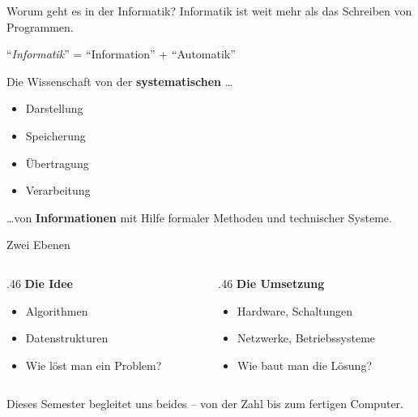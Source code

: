 \renewcommand{\thelektion}{L01 \textperiodcentered{} Was ist Informatik?}

\begin{frame}\end{frame}

\begin{frame}{Worum geht es in der Informatik?}
Informatik ist weit mehr als das Schreiben von Programmen.
\vspace{3mm}
\begin{center}
\enquote{\textit{Informatik}} = \enquote{Information} + \enquote{Automatik}
\end{center}
\vspace{3mm}\pause
Die Wissenschaft von der \textbf{systematischen} \ldots
\begin{itemize}[<+->]\setlength\itemsep{4pt}
  \item Darstellung
  \item Speicherung
  \item Übertragung
  \item Verarbeitung
\end{itemize}
\ldots von \textbf{Informationen} mit Hilfe formaler Methoden und technischer Systeme.
\end{frame}

\begin{frame}{Zwei Ebenen}
\begin{columns}[T,onlytextwidth]
\begin{column}{.46\textwidth}
  \large\bfseries\color{FDUteal}Die Idee
  \vspace{2mm}
  \normalsize\begin{itemize}[<+->]\setlength\itemsep{6pt}
    \item Algorithmen
    \item Datenstrukturen
    \item Wie löst man ein Problem?
  \end{itemize}
\end{column}\pause
\begin{column}{.46\textwidth}
  \large\bfseries\color{FDUblue}Die Umsetzung
  \vspace{2mm}
  \normalsize\begin{itemize}[<+->]\setlength\itemsep{6pt}
    \item Hardware, Schaltungen
    \item Netzwerke, Betriebssysteme
    \item Wie baut man die Lösung?
  \end{itemize}
\end{column}
\end{columns}
\vfill\small\color{FDUteal}Dieses Semester begleitet uns beides -- von der Zahl bis zum fertigen Computer.
\end{frame}

